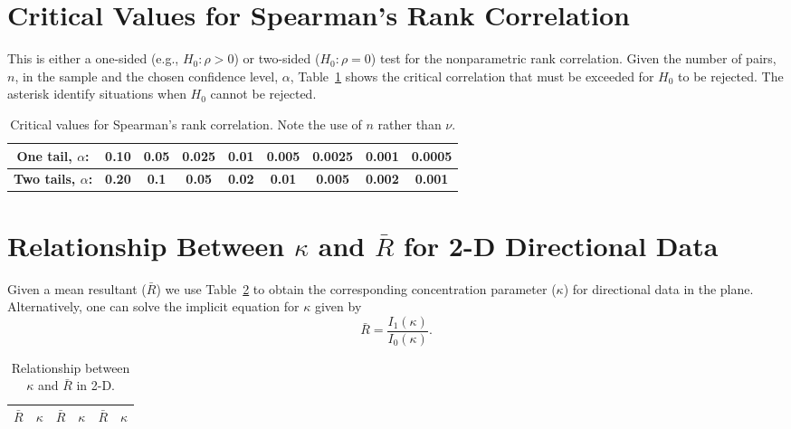 \clearpage
\section{Critical Values for Spearman's Rank Correlation}
This is either a one-sided (e.g., $H_0: \rho > 0$) or two-sided ($H_0: \rho = 0$) test
for the nonparametric rank correlation.  Given the number of pairs, $n$, in the sample and
the chosen confidence level, $\alpha$, Table~\ref{tbl:Critical_Spearman} shows the critical correlation that must be
exceeded for $H_0$ to be rejected.  The asterisk identify situations when $H_0$ cannot be rejected. 
\begin{table}[h]
\centering
\footnotesize
\begin{tabular}{|c|cccccccc|} \hline
\bf{One tail, } $\alpha$:  &  \bf{0.10}  & \bf{0.05} & \bf{0.025} & \bf{0.01}  & \bf{0.005}  & \bf{0.0025}  & \bf{0.001}  & \bf{0.0005} \\ \hline
\bf{Two tails, } $\alpha$:  &  \bf{0.20}  & \bf{0.1} & \bf{0.05} & \bf{0.02}  & \bf{0.01}   & \bf{0.005}   & \bf{0.002}   & \bf{0.001} \\ \hline

\end{tabular}
\normalsize
\caption{Critical values for Spearman's rank correlation.  Note the use of $n$ rather than $\nu$.}
\label{tbl:Critical_Spearman}
\end{table}

\clearpage
\section{Relationship Between $\kappa$ and $\bar{R}$ for 2-D Directional Data}
Given a mean resultant ($\bar{R}$) we use Table~\ref{tbl:Critical_kappa2} to obtain the corresponding concentration parameter ($\kappa$)
for directional data in the plane.
Alternatively, one can solve the implicit equation for $\kappa$ given by
\begin{equation}
	\bar{R} = \frac{I_1(\kappa)}{I_0(\kappa)}.
	\label{eq:kappa2d}
\end{equation}
\begin{table}[h]
\centering
\begin{tabular}{|cc|cc|cc|} \hline
$\bar{R}$  &  $\kappa$  & $\bar{R}$  &  $\kappa$ & $\bar{R}$  &  $\kappa$ \\ \hline

\end{tabular}
\caption{Relationship between $\kappa$ and $\bar{R}$ in 2-D.}
\label{tbl:Critical_kappa2}
\end{table}
\clearpage

